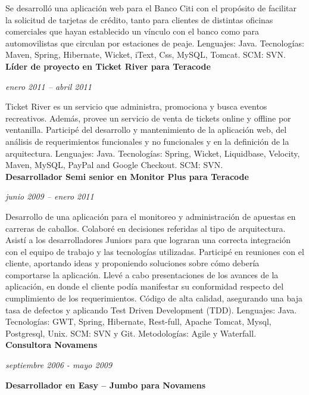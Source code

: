 \documentclass[a4paper,11pt]{article}
\begin{document}
\noindent Se desarrolló una aplicación web para el Banco Citi con el propósito
de facilitar la solicitud de tarjetas de crédito, tanto para clientes de
distintas oficinas comerciales que hayan establecido un vínculo con el banco
como para automovilistas que circulan por estaciones de peaje.  Lenguajes:
Java.
Tecnologías: Maven, Spring, Hibernate, Wicket, iText, Css, MySQL, Tomcat.
SCM: SVN. \\

\noindent \textbf{Líder de proyecto en Ticket River para Teracode}

\noindent \emph{enero 2011 –  abril 2011}

\noindent Ticket River es un servicio que administra, promociona y busca
eventos recreativos. Además, provee un servicio de venta de tickets online y
offline por ventanilla.  Participé del desarrollo y mantenimiento de la
aplicación web, del análisis de requerimientos funcionales y no funcionales y
en la definición de la arquitectura.
Lenguajes: Java.
Tecnologías: Spring, Wicket, Liquidbase, Velocity, Maven, MySQL, PayPal and
Google Checkout.  SCM: SVN. \\

\noindent \textbf{Desarrollador Semi senior en Monitor Plus para Teracode}

\noindent \emph{junio 2009 –  enero 2011}

\noindent Desarrollo de una aplicación para el monitoreo y administración de
apuestas en carreras de caballos.  Colaboré en decisiones referidas al tipo de
arquitectura.
Asistí a los desarrolladores Juniors para que lograran una correcta integración
con el equipo de trabajo y las tecnologías utilizadas.  Participé en reuniones
con el cliente, aportando ideas y proponiendo soluciones sobre cómo debería
comportarse la aplicación.
Llevé a cabo presentaciones de los avances de la aplicación, en donde el
cliente podía manifestar su conformidad respecto del cumplimiento de los
requerimientos.  Código de alta calidad, asegurando una baja tasa de defectos y
aplicando Test Driven Development (TDD).
Lenguajes: Java.
Tecnologías: GWT, Spring, Hibernate, Rest-full, Apache Tomcat, Mysql,
Postgresql, Unix.  SCM: SVN y Git.
Metodologías: Agile y Waterfall. \\


\noindent \textbf{Consultora Novamens}

\noindent \emph{septiembre 2006 - mayo 2009}

\noindent \textbf{Desarrollador en Easy – Jumbo para Novamens}
\end{document}
